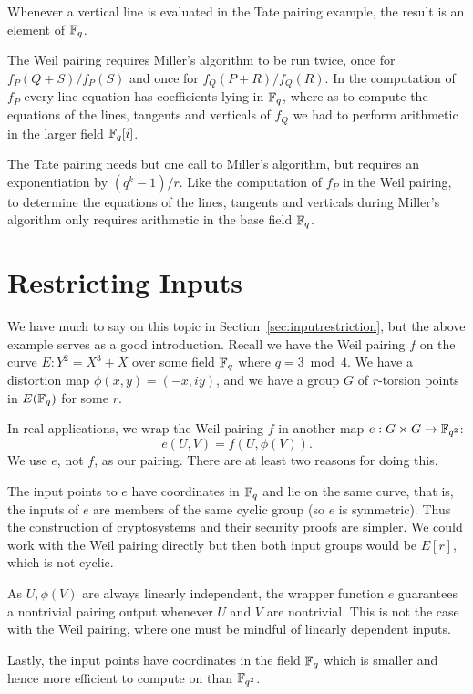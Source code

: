 Whenever a vertical line is evaluated in the Tate pairing example, the result
is an element of $\mathbb{F}_q$.

The Weil pairing requires Miller's algorithm to be run twice, once for
$f_P(Q+S) / f_P(S)$ and once for $f_Q(P+R)/f_Q(R)$. In the computation
of $f_P$ every line equation has coefficients lying in $\mathbb{F}_q$, where
as to compute the equations of the lines, tangents and verticals of $f_Q$
we had to perform arithmetic in the larger field $\mathbb{F}_q[i]$.

The Tate pairing needs but one call to Miller's algorithm,
but requires an exponentiation by $(q^k - 1)/r$. Like the computation
of $f_P$ in the Weil pairing, to determine the equations of the lines,
tangents and verticals during Miller's algorithm only requires arithmetic
in the base field $\mathbb{F}_q$.

\section {Restricting Inputs}

We have much to say on this topic in Section~\ref{sec:inputrestriction}, but
the above example serves as a good introduction. Recall we have the Weil
pairing $f$ on the curve $E : Y^2 = X^3 + X$ over some field $\mathbb{F}_q$
where $q = 3 \bmod 4$. We have a distortion
map $\phi(x,y) = (-x, i y)$, and we have
a group $G$ of $r$-torsion points in $E(\mathbb{F}_q)$ for some $r$.

In real applications, we wrap the Weil pairing $f$ in another map
$e : G\times G \rightarrow \mathbb{F}_{q^2}$:
\[ e(U, V) = f(U, \phi(V)) . \]
We use $e$, not $f$, as our pairing.
There are at least two reasons for doing this.

The input points to $e$ have coordinates in $\mathbb{F}_q$ and lie on the same curve,
that is, the inputs of $e$ are members of the same cyclic group (so $e$ is
symmetric). Thus the construction of cryptosystems and their
security proofs are simpler. We could work with the Weil pairing directly but
then both input groups would be $E[r]$, which is not cyclic.

As $U, \phi(V)$ are always linearly independent, the wrapper function $e$
guarantees a nontrivial pairing output whenever $U$ and $V$ are nontrivial.
This is not the case with the Weil pairing, where one must be mindful of
linearly dependent inputs.

Lastly, the input points have coordinates in the field $\mathbb{F}_q$ which is
smaller and hence more efficient to compute on than $\mathbb{F}_{q^2}$.

